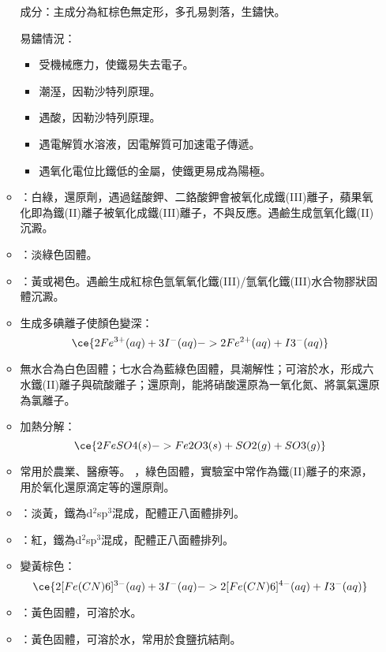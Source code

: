 \documentclass[a4paper,12pt]{report}
\begin{document}
\begin{itemize}
\begin{itemize}
成分：主成分為紅棕色無定形，多孔易剝落，生鏽快。

易鏽情況：
\begin{itemize}
\item 受機械應力，使鐵易失去電子。
\item 潮溼，因勒沙特列原理。
\item 遇酸，因勒沙特列原理。
\item 遇電解質水溶液，因電解質可加速電子傳遞。
\item 遇氧化電位比鐵低的金屬，使鐵更易成為陽極。
\end{itemize}
\bit
\item {}：白綠，還原劑，遇過錳酸鉀、二鉻酸鉀會被氧化成鐵(III)離子，蘋果氧化即為鐵(II)離子被氧化成鐵(III)離子，不與反應。遇鹼生成氫氧化鐵(II)沉澱。
\item {}：淡綠色固體。
\eit
{}
\bit
\item {}：黃或褐色。遇鹼生成紅棕色氫氧氧化鐵(III)/氫氧化鐵(III)水合物膠狀固體沉澱。
\item {}生成多碘離子使顏色變深：
\[\ce{2Fe^{3+}(aq) + 3I^-(aq) -> 2Fe^{2+}(aq) + I3^-(aq)}\]
\eit
{}
\bit
\item 無水合為白色固體；七水合為藍綠色固體，具潮解性；可溶於水，形成六水鐵(II)離子與硫酸離子；還原劑，能將硝酸還原為一氧化氮、將氯氣還原為氯離子。
\item 加熱分解：
\[\ce{2FeSO4(s) -> Fe2O3(s) + SO2(g) + SO3(g)}\]
\item 常用於農業、醫療等。
\eit
{}
，綠色固體，實驗室中常作為鐵(II)離子的來源，用於氧化還原滴定等的還原劑。
\bit
\item {}：淡黃，鐵為d$^2$sp$^3$混成，配體正八面體排列。
\item {}：紅，鐵為d$^2$sp$^3$混成，配體正八面體排列。
\item {}變黃棕色：
\[\ce{2[Fe(CN)6]^{3-}(aq) + 3I^-(aq) -> 2[Fe(CN)6]^{4-}(aq) + I3^-(aq)}\]
\item {}：黃色固體，可溶於水。
\item {}：黃色固體，可溶於水，常用於食鹽抗結劑。

\end{itemize}
\end{itemize}
\end{document}
